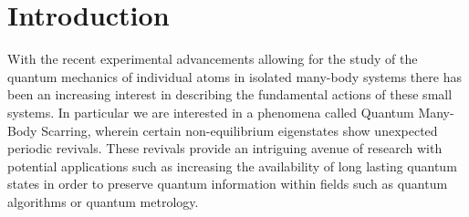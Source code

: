 \chapter{Introduction}

With the recent experimental advancements allowing for the study of the quantum mechanics of individual atoms in isolated many-body systems there has been an increasing interest in describing the fundamental actions of these small systems. In particular we are interested in a phenomena called Quantum Many-Body Scarring, wherein certain non-equilibrium eigenstates show unexpected periodic revivals. These revivals provide an intriguing avenue of research with potential applications such as increasing the availability of long lasting quantum states in order to preserve quantum information within fields such as quantum algorithms or quantum metrology.


